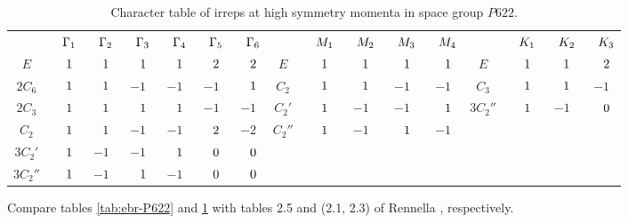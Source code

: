 \begin{table}[H]
\caption{Character table of irreps at high symmetry momenta in space group $P622$.}
\scriptsize
\centering
\begin{tabular} { c c c c c c c | c c c c c | c c c c }
\cline{1-16}
$\P$ & $\P \Gamma_1$ & $\P \Gamma_2$ & $\P \Gamma_3$ & $\P \Gamma_4$ & $\P \Gamma_5$ & $\P \Gamma_6$ & $\P$ & $\P M_1$ & $\P M_2$ & $\P M_3$ & $\P M_4$ & $\P$ & $\P K_1$ & $\P K_2$ & $\P K_3$\\
\cline{1-16}
$E$      & $\P1$ & $\P1$ & $\P1$ & $\P1$ & $\P2$ & $\P2$ & $E$     & $\P1$ & $\P1$  & $\P1$ & $\P1$ & $E$      & $\P1$ & $\P1$ & $\P2$ \\
$2C_6$   & $\P1$ & $\P1$ & $ -1$ & $ -1$ & $ -1$ & $\P1$ & $C_2$   & $\P1$ & $\P1$  & $ -1$ & $ -1$ & $C_3$    & $\P1$ & $\P1$ & $ -1$ \\
$2C_3$   & $\P1$ & $\P1$ & $\P1$ & $\P1$ & $ -1$ & $ -1$ & $C_2'$  & $\P1$ & $ -1$  & $ -1$ & $\P1$ & $3C_2''$ & $\P1$ & $ -1$ & $\P0$ \\
$C_2$    & $\P1$ & $\P1$ & $ -1$ & $ -1$ & $\P2$ & $ -2$ & $C_2''$ & $\P1$ & $ -1$  & $\P1$ & $ -1$ &          &       &       &       \\
$3C_2'$  & $\P1$ & $ -1$ & $ -1$ & $\P1$ & $\P0$ & $\P0$ &         &       &        &       &       &          &       &       &       \\
$3C_2''$ & $\P1$ & $ -1$ & $\P1$ & $ -1$ & $\P0$ & $\P0$ &         &       &        &       &       &          &       &       &       \\
\cline{1-16}
\end{tabular}
\label{tab:char-P622}
\end{table}

Compare tables \ref{tab:ebr-P622} and \ref{tab:char-P622} with tables 2.5 and (2.1, 2.3) of Rennella \cite{thesis_rennella}, respectively.






%
%
%
